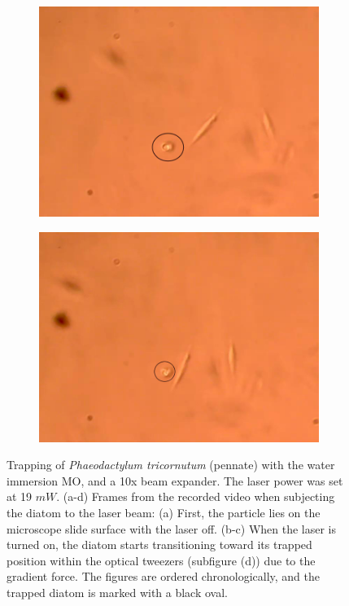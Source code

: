 \documentclass[letterpaper,12pt,oneside]{book}
\begin{document}
\begin{figure}[H]
\begin{subfigure}[b]{0.5\linewidth}
    \caption{}
    \label{fig7:b} 
    \vspace{4ex}
  \end{subfigure} 
  \begin{subfigure}[b]{0.5\linewidth}
    \centering
    \includegraphics[scale=0.2]{Results/Resultadosalgea2/secondalgeawater3.png} 
    \caption{}
    \label{fig7:c} 
  \end{subfigure}%
  \begin{subfigure}[b]{0.5\linewidth}
    \centering
    \includegraphics[scale=0.2]{Results/Resultadosalgea2/secondalgeawater4.png} 
    \caption{}
    \label{fig7:d} 
  \end{subfigure} 
  \caption{Trapping of \textit{Phaeodactylum tricornutum} (pennate) with the water immersion MO, and a 10x beam expander. The laser power was set at 19 $mW$. (a-d) Frames from the recorded video when subjecting the diatom to the laser beam: (a) First, the particle lies on the microscope slide surface with the laser off. (b-c) When the laser is turned on, the diatom starts transitioning toward its trapped position within the optical tweezers (subfigure (d)) due to the gradient force. The figures are ordered chronologically, and the trapped diatom is marked with a black oval.
}
  \label{WISECOND1} 
\end{figure}
\end{document}
